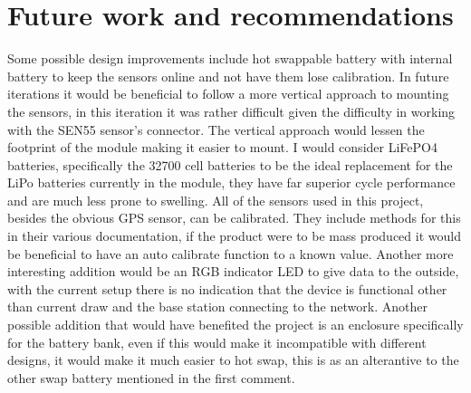 \section{Future work and recommendations}
Some possible design improvements include hot swappable battery with internal battery to keep the sensors online and not have them lose calibration. In future iterations it would be beneficial to follow a more vertical approach to mounting the sensors, in this iteration it was rather difficult given the difficulty in working with the SEN55 sensor's connector. The vertical approach would lessen the footprint of the module making it easier to mount. I would consider LiFePO4 batteries, specifically the 32700 cell batteries to be the ideal replacement for the LiPo batteries currently in the module, they have far superior cycle performance and are much less prone to swelling. All of the sensors used in this project, besides the obvious GPS sensor, can be calibrated. They include methods for this in their various documentation, if the product were to be mass produced it would be beneficial to have an auto calibrate function to a known value. Another more interesting addition would be an RGB indicator LED to give data to the outside, with the current setup there is no indication that the device is functional other than current draw and the base station connecting to the network. Another possible addition that would have benefited the project is an enclosure specifically for the battery bank, even if this would make it incompatible with different designs, it would make it much easier to hot swap, this is as an alterantive to the other swap battery mentioned in the first comment.